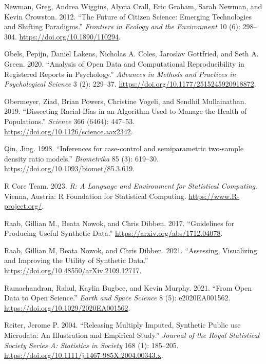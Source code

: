 \documentclass[
]{article}
\newlength{\cslhangindent}
\newlength{\cslentryspacingunit} %
\newenvironment{CSLReferences}[2] %
 {%
  \setlength{\parindent}{0pt}
  \ifodd #1
  \let\oldpar\par
  \def\par{\hangindent=\cslhangindent\oldpar}
  \fi
  \setlength{\parskip}{#2\cslentryspacingunit}
 }%
 {}
\begin{document}
\begin{CSLReferences}{1}{0}
\leavevmode{}%
Newman, Greg, Andrea Wiggins, Alycia Crall, Eric Graham, Sarah Newman,
and Kevin Crowston. 2012. {``The Future of Citizen Science: Emerging
Technologies and Shifting Paradigms.''} \emph{Frontiers in Ecology and
the Environment} 10 (6): 298--304. \url{https://doi.org/10.1890/110294}.

\leavevmode{}%
Obels, Pepijn, Daniël Lakens, Nicholas A. Coles, Jaroslav Gottfried, and
Seth A. Green. 2020. {``Analysis of Open Data and Computational
Reproducibility in Registered Reports in Psychology.''} \emph{Advances
in Methods and Practices in Psychological Science} 3 (2): 229--37.
\url{https://doi.org/10.1177/2515245920918872}.

\leavevmode{}%
Obermeyer, Ziad, Brian Powers, Christine Vogeli, and Sendhil
Mullainathan. 2019. {``Dissecting Racial Bias in an Algorithm Used to
Manage the Health of Populations.''} \emph{Science} 366 (6464): 447--53.
\url{https://doi.org/10.1126/science.aax2342}.

\leavevmode{}%
Qin, Jing. 1998. {``{Inferences for case-control and semiparametric
two-sample density ratio models}.''} \emph{Biometrika} 85 (3): 619--30.
\url{https://doi.org/10.1093/biomet/85.3.619}.

\leavevmode{}%
R Core Team. 2023. \emph{R: A Language and Environment for Statistical
Computing}. Vienna, Austria: R Foundation for Statistical Computing.
\url{https://www.R-project.org/}.

\leavevmode{}%
Raab, Gillian M., Beata Nowok, and Chris Dibben. 2017. {``Guidelines for
Producing Useful Synthetic Data.''}
\url{https://arxiv.org/abs/1712.04078}.

\leavevmode{}%
Raab, Gillian M, Beata Nowok, and Chris Dibben. 2021. {``Assessing,
Visualizing and Improving the Utility of Synthetic Data.''}
\url{https://doi.org/10.48550/arXiv.2109.12717}.

\leavevmode{}%
Ramachandran, Rahul, Kaylin Bugbee, and Kevin Murphy. 2021. {``From Open
Data to Open Science.''} \emph{Earth and Space Science} 8 (5):
e2020EA001562. \url{https://doi.org/10.1029/2020EA001562}.

\leavevmode{}%
Reiter, Jerome P. 2004. {``{Releasing Multiply Imputed, Synthetic Public
use Microdata: An Illustration and Empirical Study}.''} \emph{Journal of
the Royal Statistical Society Series A: Statistics in Society} 168 (1):
185--205. \url{https://doi.org/10.1111/j.1467-985X.2004.00343.x}.


\end{CSLReferences}
\end{document}
